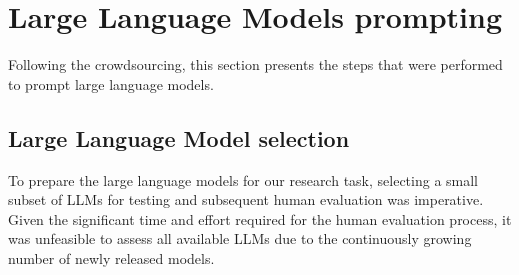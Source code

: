 \section{Large Language Models prompting}
Following the crowdsourcing, this section presents the steps that were performed to prompt large language models.
\subsection{Large Language Model selection}
To prepare the large language models for our research task, selecting a small subset of LLMs for testing and subsequent human evaluation was imperative. Given the significant time and effort required for the human evaluation process, it was unfeasible to assess all available LLMs due to the continuously growing number of newly released models.

